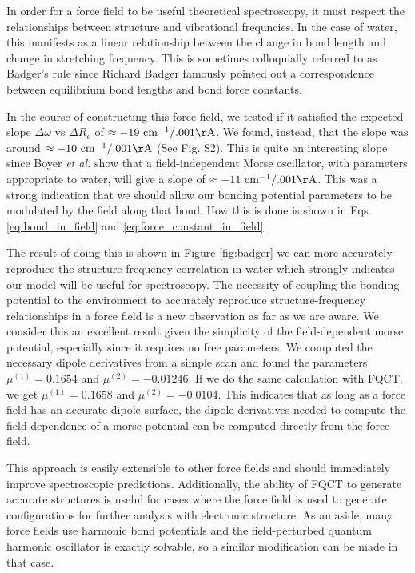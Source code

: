 \documentclass[journal=jacsat,manuscript=article]{achemso}
\begin{document}
In order for a force field to be useful theoretical spectroscopy, it must respect the relationships between structure and vibrational frequncies. In the case of water, this manifests as a linear relationship between the change in bond length and change in  stretching frequency.\cite{boyer2019beyond} This is sometimes colloquially referred to as Badger's rule since Richard Badger famously pointed out a correspondence between equilibrium bond lengths and bond force constants.\cite{badger1934relation}

In the course of constructing this force field, we tested if it satisfied the expected slope $\Delta\omega$ vs $\Delta R_e$ of $\approx -19\ \mathrm{cm^{-1}/.001\AA}$\cite{boyer2019beyond}. We found, instead, that the slope was around $\approx -10\ \mathrm{cm^{-1}/.001\AA}$ (See Fig. S2). This is quite an interesting slope since Boyer \textit{et al.} show that a field-independent Morse oscillator, with parameters appropriate to water, will give a slope of $\approx -11\ \mathrm{cm^{-1}/.001\AA}$. This was a strong indication that we should allow our bonding potential parameters to be modulated by the field along that bond. How this is done is shown in Eqs. \ref{eq:bond_in_field} and \ref{eq:force_constant_in_field}.

The result of doing this is shown in Figure \ref{fig:badger} we can more accurately reproduce the structure-frequency correlation in water which strongly indicates our model will be useful for spectroscopy. The necessity of coupling the bonding potential to the environment to accurately reproduce structure-frequency relationships in a force field is a new observation as far as we are aware. We consider this an excellent result given the simplicity of the field-dependent morse potential, especially since it requires no free parameters. We computed the necessary dipole derivatives from a simple  scan and found the parameters $\mu^{(1)}=0.1654$ and $\mu^{(2)}=-0.01246$. If we do the same calculation with FQCT, we get $\mu^{(1)}=0.1658$ and $\mu^{(2)}=-0.0104$. This indicates that as long as a force field has an accurate dipole surface, the dipole derivatives needed to compute the field-dependence of a morse potential can be computed directly from the force field.

This approach is easily extensible to other force fields and should immediately improve spectroscopic predictions. Additionally, the ability of FQCT to generate accurate structures is useful for cases where the force field is used to generate configurations for further analysis with electronic structure. As an aside, many force fields use harmonic bond potentials and the field-perturbed quantum harmonic oscillator is exactly solvable, so a similar modification can be made in that case.
\end{document}

